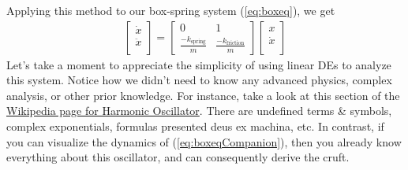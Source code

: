 \documentclass[11pt, oneside]{article}   	%
\begin{document}
Applying this method to our box-spring system (\ref*{eq:boxeq}), we get
\begin{align} \label{eq:boxeqCompanion}
\begin{bmatrix}
        \dot{x} \\
        \ddot{x} \\
      \end{bmatrix}
  =
      \begin{bmatrix}
        0 & 1 \\
        \frac{-k_\mathrm{spring}}{m} & \frac{-k_\mathrm{friction}}{m}
      \end{bmatrix}
      \begin{bmatrix}
        x \\
        \dot{x} \\
      \end{bmatrix}
\end{align}
Let's take a moment to appreciate the simplicity of using linear DEs to analyze this system.
Notice how we didn't need to know any advanced physics, complex analysis, or other prior knowledge.
For instance, take a look at this section of the \href{https://en.wikipedia.org/wiki/Harmonic_oscillator#Universal_oscillator_equation}{Wikipedia page for Harmonic Oscillator}.
There are undefined terms \& symbols, complex exponentials, formulas presented deus ex machina, etc.
In contrast, if you can visualize the dynamics of (\ref*{eq:boxeqCompanion}),
then you already know everything about this oscillator, and can consequently derive the cruft.
\end{document}
